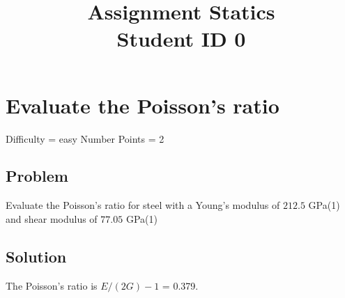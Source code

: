 \documentclass{article}
\title{Assignment Statics \\ Student ID 0}
\begin{document}
\maketitle

\section{Evaluate the Poisson's ratio}
Difficulty = easy
Number Points = 2
\subsection{Problem}
Evaluate the Poisson's ratio for steel with a Young's modulus of $212.5$ GPa(1) and shear modulus of $77.05$ GPa(1)
\subsection{Solution}
The Poisson's ratio is $E/(2G) - 1$ = 0.379.
\end{document}
